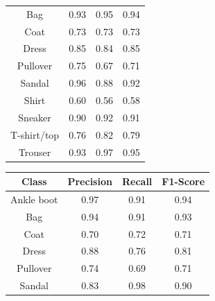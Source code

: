 \begin{table}[H]
\begin{minipage}{0.32\textwidth}
\begin{adjustbox}{max width=1\textwidth}
\begin{tabular}{|c|c|c|c|}
                Bag                & 0.93               & 0.95            & 0.94              \\
                Coat               & 0.73               & 0.73            & 0.73              \\
                Dress              & 0.85               & 0.84            & 0.85              \\
                Pullover           & 0.75               & 0.67            & 0.71              \\
                Sandal             & 0.96               & 0.88            & 0.92              \\
                Shirt              & 0.60               & 0.56            & 0.58              \\
                Sneaker            & 0.90               & 0.92            & 0.91              \\
                T-shirt/top        & 0.76               & 0.82            & 0.79              \\
                Trouser            & 0.93               & 0.97            & 0.95              \\ \hline
            \end{tabular}
        \end{adjustbox}
    \end{minipage}
    \hfill
    \begin{minipage}{0.32\textwidth}
        \centering
        \begin{adjustbox}{max width=1\textwidth}
            \begin{tabular}{|c|c|c|c|}
                \hline
                \textbf{Class}     & \textbf{Precision} & \textbf{Recall} & \textbf{F1-Score} \\ \hline
                Ankle boot         & 0.97               & 0.91            & 0.94              \\
                Bag                & 0.94               & 0.91            & 0.93              \\
                Coat               & 0.70               & 0.72            & 0.71              \\
                Dress              & 0.88               & 0.76            & 0.81              \\
                Pullover           & 0.74               & 0.69            & 0.71              \\
                Sandal             & 0.83               & 0.98            & 0.90              \\

\end{tabular}
\end{adjustbox}
\end{minipage}
\end{table}
